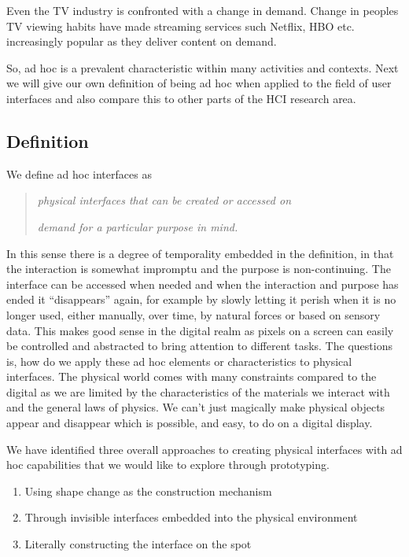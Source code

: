 Even the TV industry is confronted with a change in demand.
Change in peoples TV viewing habits have made streaming services such Netflix, HBO etc. increasingly popular as they deliver content on demand.


So, ad hoc is a prevalent characteristic within many activities and contexts.
Next we will give our own definition of being ad hoc when applied to the field of user interfaces and also compare this to other parts of the HCI research area.

\subsection{Definition} 
We define ad hoc interfaces as 

\begin{quotation}\label{adhoc:definition}
\emph{physical interfaces that can be created or accessed on} 

\emph{demand for a particular purpose in mind. }
\end{quotation}

In this sense there is a degree of temporality embedded in the definition, in that the interaction is somewhat impromptu and the purpose is non-continuing.
The interface can be accessed when needed and when the interaction and purpose has ended it ``disappears'' again, for example by slowly letting it perish when it is no longer used, either manually, over time, by natural forces or based on sensory data.
This makes good sense in the digital realm as pixels on a screen can easily be controlled and abstracted to bring attention to different tasks.
The questions is, how do we apply these ad hoc elements or characteristics to physical interfaces.
The physical world comes with many constraints compared to the digital as we are limited by the characteristics of the materials we interact with and the general laws of physics.
We can't just magically make physical objects appear and disappear which is possible, and easy, to do on a digital display.


We have identified three overall approaches to creating physical interfaces with ad hoc capabilities that we would like to explore through prototyping.

\begin{enumerate}
	\item{Using shape change as the construction mechanism}
	\item{Through invisible interfaces embedded into the physical environment}
	\item{Literally constructing the interface on the spot}
\end{enumerate}

